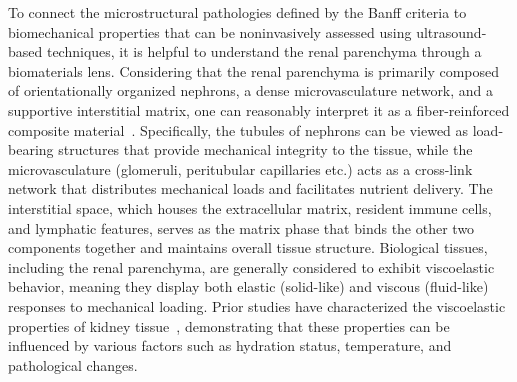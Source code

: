 
To connect the microstructural pathologies defined by the Banff criteria to biomechanical properties that can be noninvasively assessed using ultrasound-based techniques, it is helpful to understand the renal parenchyma through a biomaterials lens. Considering that the renal parenchyma is primarily composed of orientationally organized nephrons, a dense microvasculature network, and a supportive interstitial matrix, one can reasonably interpret it as a fiber-reinforced composite material~\cite{karimi_Measurement_2017,gennisson_Supersonic_2012}. Specifically, the tubules of nephrons can be viewed as load-bearing structures that provide mechanical integrity to the tissue, while the microvasculature (glomeruli, peritubular capillaries etc.) acts as a cross-link network that distributes mechanical loads and facilitates nutrient delivery. The interstitial space, which houses the extracellular matrix, resident immune cells, and lymphatic features, serves as the matrix phase that binds the other two components together and maintains overall tissue structure. Biological tissues, including the renal parenchyma, are generally considered to exhibit viscoelastic behavior, meaning they display both elastic (solid-like) and viscous (fluid-like) responses to mechanical loading. Prior studies have characterized the viscoelastic properties of kidney tissue~\cite{karimi_Measurement_2017,liu_Effect_2017,pirsoltan_Investigation_2025,vasconcelos_Kidney_2024}, demonstrating that these properties can be influenced by various factors such as hydration status, temperature, and pathological changes. 



